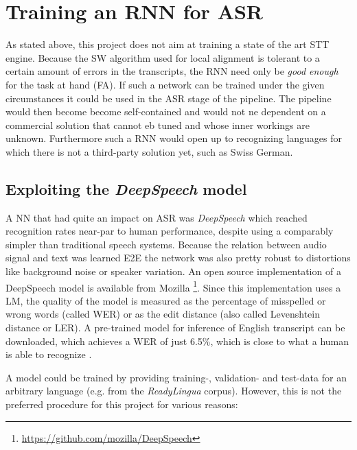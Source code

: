 \section{Training an \ac{RNN} for \ac{ASR}}\label{ds}
As stated above, this project does not aim at training a state of the art \ac{STT} engine. Because the \ac{SW} algorithm used for local alignment is tolerant to a certain amount of errors in the transcripts, the \ac{RNN} need only be \textit{good enough} for the task at hand (\ac{FA}). If such a network can be trained under the given circumstances it could be used in the \ac{ASR} stage of the pipeline. The pipeline would then become become self-contained and would not ne dependent on a commercial solution that cannot eb tuned and whose inner workings are unknown. Furthermore such a \ac{RNN} would open up to recognizing languages for which there is not a third-party solution yet, such as Swiss German.

\subsection{Exploiting the \textit{DeepSpeech} model}

A \ac{NN} that had quite an impact on \ac{ASR} was \textit{DeepSpeech} \parencite{deepspeech} which reached recognition rates near-par to human performance, despite using a comparably simpler than traditional speech systems. Because the relation between audio signal and text was learned \ac{E2E} the network was also pretty robust to distortions like background noise or speaker variation. An open source implementation of a DeepSpeech model is available from Mozilla \footnote{\url{https://github.com/mozilla/DeepSpeech}}. Since this implementation uses a \ac{LM}, the quality of the model is measured as the percentage of misspelled or wrong words (called \ac{WER}) or as the edit distance (also called Levenshtein distance or \ac{LER}). A pre-trained model for inference of English transcript can be downloaded, which achieves a \ac{WER} of just 6.5\%, which is close to what a human is able to recognize \parencite{mozillajourney}.

A model could be trained by providing training-, validation- and test-data for an arbitrary language (e.g. from the \textit{ReadyLingua} corpus). However, this is not the preferred procedure for this project for various reasons:


